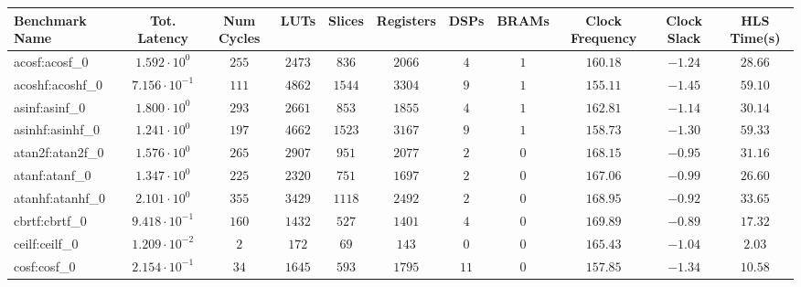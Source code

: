 \begin{tabular}{|l|c|c|c|c|c|c|c|c|c|c|}
\hline
Benchmark Name               & Tot. Latency            & Num Cycles & LUTs      & Slices    & Registers & DSPs    & BRAMs & Clock Frequency & Clock Slack & HLS Time(s) \\
\hline
acosf:acosf\_0               & $ 1.592 \cdot 10^{0}  $ & $ 255    $ & $ 2473  $ & $ 836   $ & $ 2066  $ & $ 4   $ & $ 1 $ & $ 160.18      $ & $ -1.24   $ & $ 28.66   $ \\
acoshf:acoshf\_0             & $ 7.156 \cdot 10^{-1} $ & $ 111    $ & $ 4862  $ & $ 1544  $ & $ 3304  $ & $ 9   $ & $ 1 $ & $ 155.11      $ & $ -1.45   $ & $ 59.10   $ \\
asinf:asinf\_0               & $ 1.800 \cdot 10^{0}  $ & $ 293    $ & $ 2661  $ & $ 853   $ & $ 1855  $ & $ 4   $ & $ 1 $ & $ 162.81      $ & $ -1.14   $ & $ 30.14   $ \\
asinhf:asinhf\_0             & $ 1.241 \cdot 10^{0}  $ & $ 197    $ & $ 4662  $ & $ 1523  $ & $ 3167  $ & $ 9   $ & $ 1 $ & $ 158.73      $ & $ -1.30   $ & $ 59.33   $ \\
atan2f:atan2f\_0             & $ 1.576 \cdot 10^{0}  $ & $ 265    $ & $ 2907  $ & $ 951   $ & $ 2077  $ & $ 2   $ & $ 0 $ & $ 168.15      $ & $ -0.95   $ & $ 31.16   $ \\
atanf:atanf\_0               & $ 1.347 \cdot 10^{0}  $ & $ 225    $ & $ 2320  $ & $ 751   $ & $ 1697  $ & $ 2   $ & $ 0 $ & $ 167.06      $ & $ -0.99   $ & $ 26.60   $ \\
atanhf:atanhf\_0             & $ 2.101 \cdot 10^{0}  $ & $ 355    $ & $ 3429  $ & $ 1118  $ & $ 2492  $ & $ 2   $ & $ 0 $ & $ 168.95      $ & $ -0.92   $ & $ 33.65   $ \\
cbrtf:cbrtf\_0               & $ 9.418 \cdot 10^{-1} $ & $ 160    $ & $ 1432  $ & $ 527   $ & $ 1401  $ & $ 4   $ & $ 0 $ & $ 169.89      $ & $ -0.89   $ & $ 17.32   $ \\
ceilf:ceilf\_0               & $ 1.209 \cdot 10^{-2} $ & $ 2      $ & $ 172   $ & $ 69    $ & $ 143   $ & $ 0   $ & $ 0 $ & $ 165.43      $ & $ -1.04   $ & $ 2.03    $ \\
cosf:cosf\_0                 & $ 2.154 \cdot 10^{-1} $ & $ 34     $ & $ 1645  $ & $ 593   $ & $ 1795  $ & $ 11  $ & $ 0 $ & $ 157.85      $ & $ -1.34   $ & $ 10.58   $ \\

\end{tabular}
